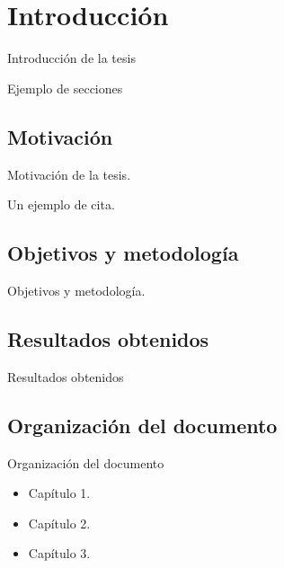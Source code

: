 \chapter{Introducción}
\label{introduccion}

Introducción de la tesis

Ejemplo de secciones

\section{Motivación}

Motivación de la tesis.

Un ejemplo de cita.\cite{web:unlp}

\section{Objetivos y metodología}

Objetivos y metodología.

\section{Resultados obtenidos}

Resultados obtenidos

\section{Organización del documento}

Organización del documento

\begin{itemize}
    \item Capítulo 1.
    \item Capítulo 2.
    \item Capítulo 3.
\end{itemize}